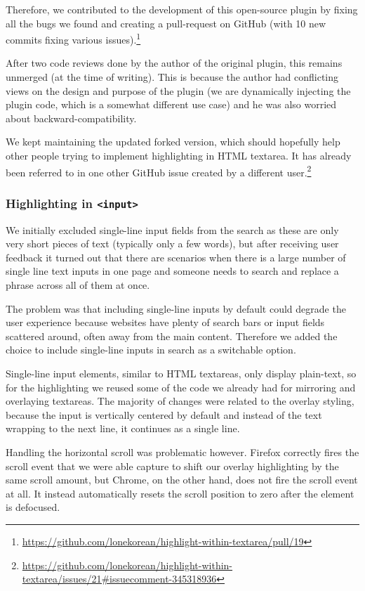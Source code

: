 \documentclass[bsc,frontabs,twoside,singlespacing,parskip,deptreport]{infthesis}
\begin{document}
Therefore, we contributed to the development of this open-source plugin by fixing all the bugs we found and creating a pull-request on GitHub (with 10 new commits fixing various issues).\footnote{\url{https://github.com/lonekorean/highlight-within-textarea/pull/19}}

After two code reviews done by the author of the original plugin, this remains unmerged (at the time of writing). This is because the author had conflicting views on the design and purpose of the plugin (we are dynamically injecting the plugin code, which is a somewhat different use case) and he was also worried about backward-compatibility. 

We kept maintaining the updated forked version, which should hopefully help other people trying to implement highlighting in HTML textarea. It has already been referred to in one other GitHub issue created by a different user.\footnote{\url{https://github.com/lonekorean/highlight-within-textarea/issues/21\#issuecomment-345318936}}

\subsubsection{Highlighting in \texttt{\textless{}input\textgreater{}}}
We initially excluded single-line input fields from the search as these are only very short pieces of text (typically only a few words), but after receiving user feedback it turned out that there are scenarios when there is a large number of single line text inputs in one page and someone needs to search and replace a phrase across all of them at once.

The problem was that including single-line inputs by default could degrade the user experience because websites have plenty of search bars or input fields scattered around, often away from the main content. Therefore we added the choice to include single-line inputs in search as a switchable option.

Single-line input elements, similar to HTML textareas, only display plain-text, so for the highlighting we reused some of the code we already had for mirroring and overlaying textareas. The majority of changes were related to the overlay styling, because the input is vertically centered by default and instead of the text wrapping to the next line, it continues as a single line.

Handling the horizontal scroll was problematic however. Firefox correctly fires the scroll event that we were able capture to shift our overlay highlighting by the same scroll amount, but Chrome, on the other hand, does not fire the scroll event at all. It instead automatically resets the scroll position to zero after the element is defocused.
\end{document}
